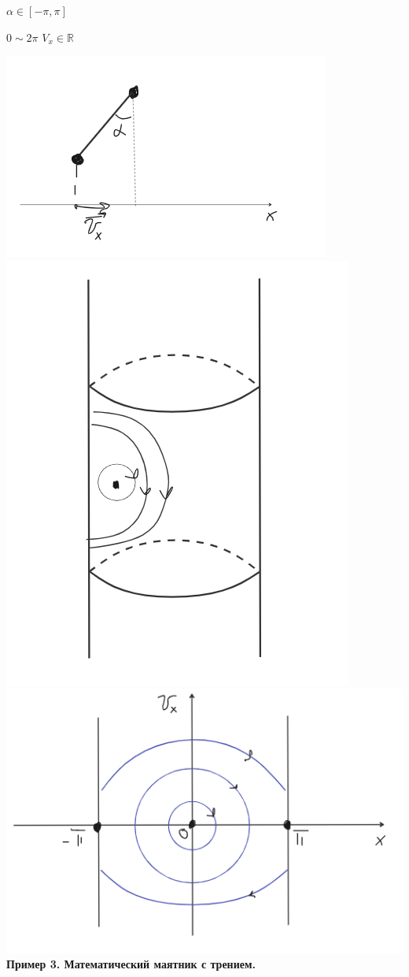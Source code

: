 \documentclass[12pt,a4paper]{article}
\begin{document}
$\alpha \in [-\pi , \pi]$

$0\sim 2\pi$
$V_x \in \mathbb{R}$


\includegraphics[scale=0.5]{image12.png}
\includegraphics[scale=0.3]{image6.png}
\newline
\includegraphics[scale=0.4]{image7.png}
 \newpage \textbf{Пример 3. Математический маятник с трением.}
\end{document}
